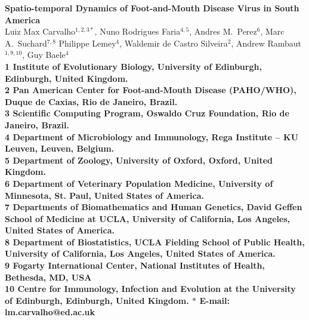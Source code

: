 \documentclass[10pt]{article}
\date{}
\begin{document}
\begin{flushleft}
{\Large
\textbf{Spatio-temporal Dynamics of Foot-and-Mouth Disease Virus in South America}
}
\\
Luiz Max Carvalho$^{1,2,3\ast}$,
Nuno Rodrigues Faria$^{4,5}$,
Andres M.~Perez$^{6}$,
Marc A.~Suchard$^{7,8}$
Philippe Lemey$^{4}$,
Waldemir de Castro Silveira$^{2}$,
Andrew Rambaut$^{1,9,10}$,
Guy Baele$^{4}$
\\
\bf{1} Institute of Evolutionary Biology, University of Edinburgh, Edinburgh, United Kingdom.\\
\bf{2} Pan American Center for Foot-and-Mouth Disease (PAHO/WHO), Duque de Caxias, Rio de Janeiro, Brazil.\\
\bf{3} Scientific Computing Program, Oswaldo Cruz Foundation, Rio de Janeiro, Brazil.\\
\bf{4} Department of Microbiology and Immunology, Rega Institute -- KU Leuven, Leuven, Belgium.\\
\bf{5} Department of Zoology, University of Oxford, Oxford, United Kingdom.\\
\bf{6} Department of Veterinary Population Medicine, University of Minnesota, St. Paul, United States of America.\\
\bf{7} Departments of Biomathematics and Human Genetics, David Geffen School of Medicine at UCLA, University of California, Los Angeles,  United States of America.\\
\bf{8} Department of Biostatistics, UCLA Fielding School of Public Health, University of California, Los Angeles,  United States of America.\\
\bf{9}  Fogarty International Center, National Institutes of Health, Bethesda, MD, USA\\
\bf{10} Centre for Immunology, Infection and Evolution at the University of Edinburgh, Edinburgh, United Kingdom.
$\ast$ E-mail: lm.carvalho@ed.ac.uk
\end{flushleft}
\end{document}
